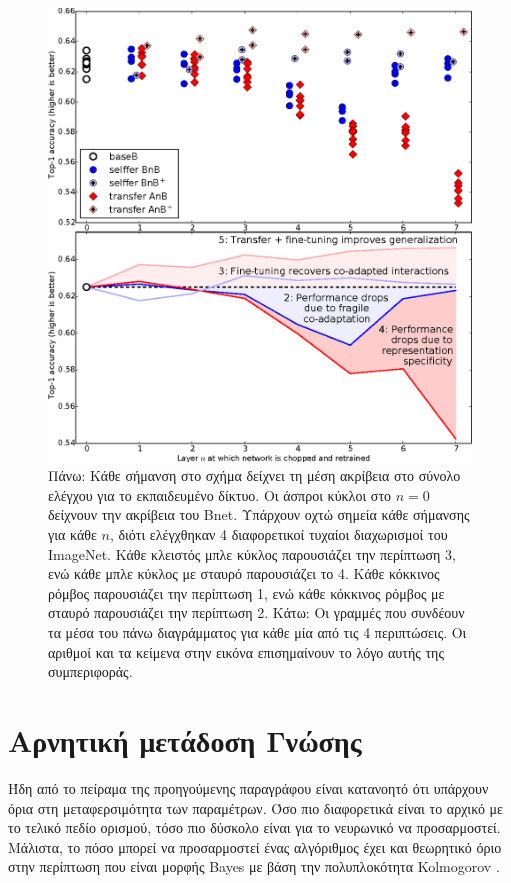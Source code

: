 \begin{figure}
\centering
\includegraphics[width = \textwidth]{figures/transferLearning/net_transferability_results.png}
\caption[Τα αποτελέσματα της μετάδοσης γνώσης από το πείραμα μεταφερσιμότητα παραμέτρων]{Πάνω: Κάθε σήμανση στο σχήμα δείχνει τη μέση ακρίβεια στο σύνολο ελέγχου για το εκπαιδευμένο δίκτυο. Οι άσπροι κύκλοι στο $n=0$ δείχνουν την ακρίβεια του Bnet. Υπάρχουν οχτώ σημεία κάθε σήμανσης για κάθε $n$, διότι ελέγχθηκαν 4 διαφορετικοί τυχαίοι διαχωρισμοί του ImageNet. Κάθε κλειστός μπλε κύκλος παρουσιάζει την περίπτωση 3, ενώ κάθε μπλε κύκλος με σταυρό παρουσιάζει το 4. Κάθε κόκκινος ρόμβος παρουσιάζει την περίπτωση 1, ενώ κάθε κόκκινος ρόμβος με σταυρό παρουσιάζει την περίπτωση 2.  Κάτω: Οι γραμμές που συνδέουν τα μέσα του πάνω διαγράμματος για κάθε μία από τις 4 περιπτώσεις. Οι αριθμοί και τα κείμενα στην εικόνα επισημαίνουν το λόγο αυτής της συμπεριφοράς.}
\label{fig:net_transferability_results}
\end{figure}


\section{Αρνητική μετάδοση Γνώσης}
Ήδη από το πείραμα της προηγούμενης παραγράφου είναι κατανοητό ότι υπάρχουν όρια στη μεταφερσιμότητα των παραμέτρων. Όσο πιο διαφορετικά είναι το αρχικό με το τελικό πεδίο ορισμού, τόσο πιο δύσκολο είναι για το νευρωνικό να προσαρμοστεί. Μάλιστα, το πόσο μπορεί να προσαρμοστεί ένας αλγόριθμος έχει και θεωρητικό όριο στην περίπτωση που είναι μορφής Bayes με βάση την πολυπλοκότητα Kolmogorov \cite{61}. 

